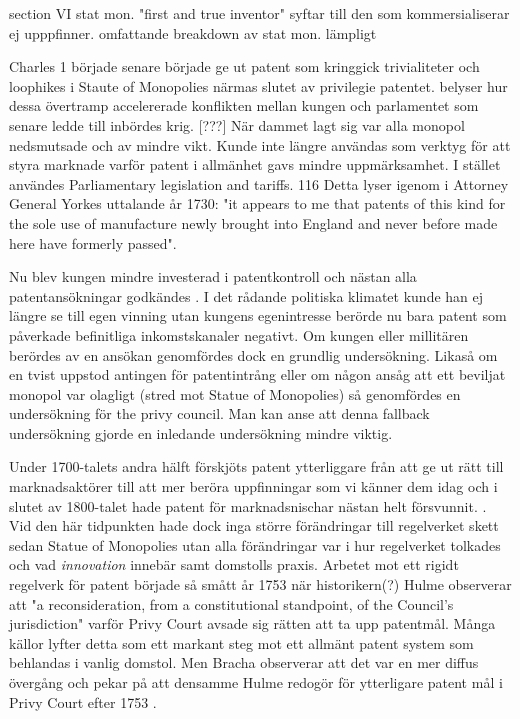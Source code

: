 section VI stat mon. "first and true inventor" syftar till den som kommersialiserar ej upppfinner.
omfattande breakdown av stat mon. lämpligt

Charles 1 började senare började ge ut patent som kringgick trivialiteter och loophikes i Staute of
Monopolies närmas slutet av privilegie patentet. \cite{Fox} belyser hur dessa övertramp accelererade
konflikten mellan kungen och parlamentet som senare ledde till inbördes krig. [???] När dammet lagt sig
var alla monopol nedsmutsade och av mindre vikt. Kunde inte längre användas som verktyg för att styra
marknade varför patent i allmänhet gavs mindre uppmärksamhet. I stället användes Parliamentary
legislation and tariffs. 116 Detta lyser igenom i Attorney General Yorkes uttalande år 1730: "it appears to me that patents of this kind for the sole use of manufacture newly brought into England and never before made here have formerly passed"\cite{macleod2}. 

Nu blev kungen mindre investerad i patentkontroll och nästan alla
patentansökningar godkändes \cite{ochra}. I det rådande politiska klimatet kunde han ej längre se till
egen vinning utan kungens egenintresse berörde nu bara patent som påverkade befinitliga inkomstskanaler
negativt. \cite{macleod2} Om kungen eller millitären berördes av en ansökan genomfördes dock en grundlig
undersökning. Likaså om en tvist uppstod antingen för patentintrång eller om någon ansåg att ett beviljat
monopol var olagligt (stred mot Statue of Monopolies) så genomfördes en undersökning för the privy
council. Man kan anse att denna fallback undersökning gjorde en inledande undersökning mindre viktig.

Under 1700-talets andra hälft förskjöts patent ytterliggare från att ge ut rätt till marknadsaktörer till att mer beröra uppfinningar som vi känner dem idag och i slutet av 1800-talet hade patent för marknadsnischar nästan helt försvunnit. \cite{bracha}. 
Vid den här tidpunkten hade dock inga större förändringar till regelverket skett sedan Statue of Monopolies
utan alla förändringar var i hur regelverket tolkades och vad \emph{innovation} innebär samt domstolls
praxis. Arbetet mot ett rigidt regelverk för patent började så smått år 1753 när historikern(?) Hulme \cite{hulme} observerar att "a reconsideration, from a constitutional standpoint, of the Council’s jurisdiction" varför Privy Court avsade sig rätten att ta upp patentmål. Många källor lyfter detta som ett markant steg mot ett allmänt patent system som behlandas i vanlig domstol. Men Bracha observerar att det var en mer diffus övergång och pekar på att densamme Hulme redogör för ytterligare patent mål i Privy Court efter 1753 \cite{bracha}.

